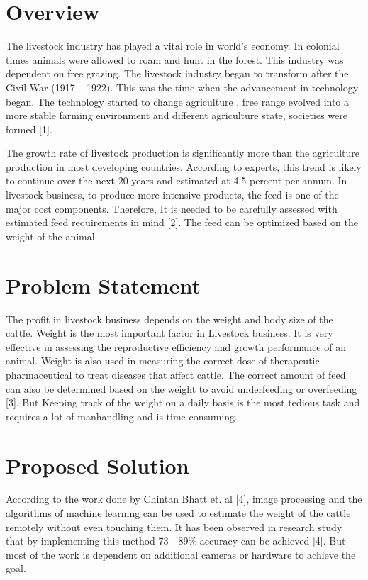 

\section{Overview}
The livestock industry has played a vital role in world’s economy. In colonial times animals were allowed to roam and hunt in the forest. This industry was dependent on free grazing. The livestock industry began to transform after the Civil War (1917 – 1922). This was the time when the advancement in technology began.  The technology started to change agriculture , free range evolved into a more stable farming environment and different agriculture state, societies were formed [1]. 


The growth rate of livestock production is significantly more than the agriculture production in most developing countries. According to experts, this trend is likely to continue over the next 20 years and estimated at 4.5 percent per annum. In livestock business, to produce more intensive products, the feed is one of the major cost components. Therefore, It is needed to be carefully assessed with estimated feed requirements in mind [2]. The feed can be optimized based on the weight of the animal.

\section{Problem Statement}

The profit in livestock business depends on the weight and body size of the cattle. Weight is the most important factor in Livestock business. It is very effective in assessing the reproductive efficiency and growth performance of an animal. Weight is also used in measuring the correct dose of therapeutic pharmaceutical to treat diseases that affect cattle. The correct amount of feed can also be determined based on the weight to avoid underfeeding or overfeeding [3]. But Keeping track of the weight on a daily basis is the most tedious task and requires a lot of manhandling and is time consuming. 
\section{Proposed Solution}

According to the work done by Chintan Bhatt et. al [4], image processing and the algorithms of machine learning can be used to estimate the weight of the cattle remotely without even touching them. It has been observed in research study that by implementing this method 73 - 89\% accuracy can be achieved [4]. But most of the work is dependent on additional cameras or hardware to achieve the goal.

